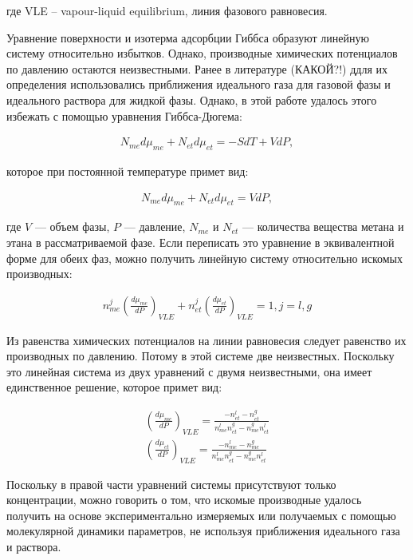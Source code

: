 где VLE \--- vapour-liquid equilibrium, линия фазового равновесия. 

Уравнение поверхности и изотерма адсорбции Гиббса образуют линейную систему относительно избытков. Однако, производные химических потенциалов по давлению остаются неизвестными. Ранее в литературе (КАКОЙ?!) ддля их определения использовались приближения идеального газа для газовой фазы и идеального раствора для жидкой фазы. Однако, в этой работе удалось этого избежать с помощью уравнения Гиббса-Дюгема:

\begin{align}
	N_{me} d \mu_{me} + N_{et} d \mu_{et} = -SdT + VdP,
\end{align}

которое при постоянной температуре примет вид:

\begin{align}
	\label{eq:GibbsDuhem}
	N_{me} d \mu_{me} + N_{et} d \mu_{et} = VdP, 
\end{align} 

где $V$ — объем фазы, $P$ — давление, $N_{me}$ и $N_{et}$ — количества вещества метана и этана в
рассматриваемой фазе. Если переписать это уравнение в эквивалентной форме для обеих фаз, можно получить линейную систему относительно искомых производных:

\begin{align}
	n_{me}^j (\frac{d \mu_{me}}{dP})_{VLE} + n_{et}^{j} (\frac{d \mu_{et}}{dP})_{VLE} = 1, j = l, g
\end{align} 

Из равенства химических потенциалов на линии равновесия следует равенство их производных по давлению. Потому в этой системе две неизвестных. Поскольку это линейная система из двух уравнений с двумя неизвестными, она имеет единственное решение, которое примет вид:

\begin{subequations}
    \label{subeq:dmudp}
    \begin{gather}
		(\frac{d \mu_{me}}{dP})_{VLE} = \frac{-n_{et}^l-n_{et}^g}{n_{me}^ln_{et}^g - n_{me}^gn_{et}^l} \label{subeq:dmudp-1} \\
		(\frac{d \mu_{et}}{dP})_{VLE} = \frac{-n_{me}^l-n_{me}^g}{n_{me}^ln_{et}^g - n_{me}^gn_{et}^l} \label{subeq:dmudp-2}
    \end{gather}
\end{subequations}

Поскольку в правой части уравнений системы присутствуют только концентрации, можно говорить о том, что искомые производные удалось получить на основе экспериментально измеряемых или получаемых с помощью молекулярной динамики параметров, не используя приближения идеального газа и раствора.

